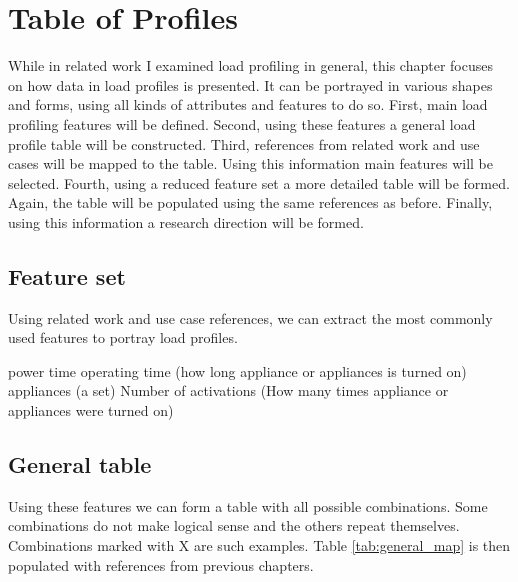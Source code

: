 \chapter{Table of Profiles} %

\label{Chapter6} 

While in related work I examined load profiling in general,
this chapter focuses on how data in load profiles is presented.  
It can be portrayed in various shapes and forms,
using all kinds of attributes and features to do so. 
First, main load profiling features will be defined.
Second, using these features a general load profile table will be constructed.
Third, references from related work and use cases will be mapped to the table.
Using this information main features will be selected.
Fourth, using a reduced feature set a more detailed table will be formed.
Again, the table will be populated using the same references as before.
Finally, using this information a research direction will be formed.

\section{Feature set} \label{sec:feature_set}

Using related work and use case references,
we can extract the most commonly used features to portray load profiles.

\begin{outline}
    \1 power
    \1 time
    \1 operating time (how long appliance or appliances is turned on)
    \1 appliances (a set)
    \1 Number of activations (How many times appliance or appliances were turned on)
\end{outline}

\section{General table}
Using these features we can form a table with all possible combinations.
Some combinations do not make logical sense and the others repeat themselves.
Combinations marked with X are such examples.
Table \ref{tab:general_map} is then populated with references from previous chapters.

